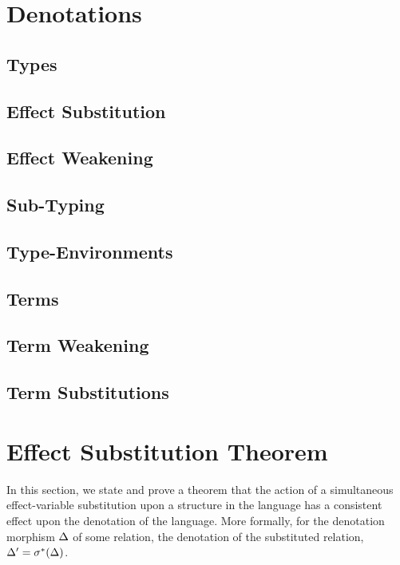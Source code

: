 \documentclass{report}
\begin{document}
\chapter{Denotations}
\effectDenotations

\section{Types}
\typeDenotationsSimple

\section{Effect Substitution}
\effectSubstitutionDenotations

\section{Effect Weakening}
\effectWeakeningDenotations

\section{Sub-Typing}
\subtypingDenotationsSimple

\section{Type-Environments}
\typeEnvDenotationsSimple

\section{Terms}

\section{Term Weakening}

\section{Term Substitutions}

\chapter{Effect Substitution Theorem}
In this section, we state and prove a theorem that the action of a simultaneous effect-variable substitution upon a structure in the language has a consistent effect upon the denotation of the language. More formally, for the denotation morphism $\Delta$ of some relation, the denotation of the substituted relation, $\Delta' = \sigma^*(\Delta)$.
\end{document}
